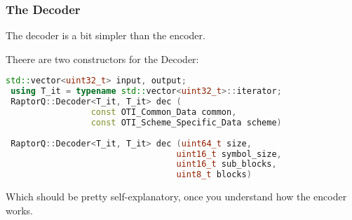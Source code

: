 \documentclass[11pt,a4paper]{refart}
\begin{document}
\newpage
\subsubsection{The Decoder}

The decoder is a bit simpler than the encoder.

Theere are two constructors for the Decoder:

\begin{lstlisting}[language=C++]
 std::vector<uint32_t> input, output;
 using T_it = typename std::vector<uint32_t>::iterator;
 RaptorQ::Decoder<T_it, T_it> dec (
                 const OTI_Common_Data common,
                 const OTI_Scheme_Specific_Data scheme)
                              
 RaptorQ::Decoder<T_it, T_it> dec (uint64_t size,
                                  uint16_t symbol_size,
                                  uint16_t sub_blocks,
                                  uint8_t blocks)
\end{lstlisting}

Which should be pretty self-explanatory, once you understand how the encoder works.
\end{document}
